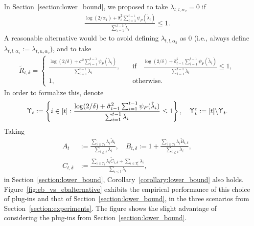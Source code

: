 In Section~\ref{section:lower_bound}, we proposed to take $\lambda_{t, l ,\alpha_2} = 0$ if
\begin{align*}
    \frac{\log(2/\alpha_1) + \hat\sigma^2_{t} \sum_{i=1}^{t-1} \psi_P(\tilde \lambda_i)}{\sum_{i=1}^{t-1} \tilde \lambda_i} \leq 1.
\end{align*}
A reasonable alternative would be to avoid defining $\lambda_{t, l ,\alpha_2}$ as $0$ (i.e., always define $\lambda_{t, l ,\alpha_2} := \lambda_{t, u ,\alpha_2}$), and to take
\begin{align*}
    \tilde R_{t, \delta} = \begin{cases}
        \frac{\log(2/\delta) + \sigma^2\sum_{i=1}^{t-1} \psi_P(\tilde \lambda_i)}{\sum_{i=1}^{t-1} \tilde \lambda_i}, \quad &\text{if} \quad \frac{\log(2/\delta) + \hat\sigma^2_{t-1} \sum_{i=1}^{t-1} \psi_P(\tilde \lambda_i)}{\sum_{i=1}^{t-1} \tilde \lambda_i} \leq 1, \\
        1, \quad &\text{otherwise}.
    \end{cases}
\end{align*}
In order to formalize this, denote
\begin{align*}
    \Upsilon_t := \left\{ i \in [t] : \frac{\log(2/\delta) + \hat\sigma^2_{t-1}\sum_{i=1}^{t-1} \psi_P(\tilde \lambda_i)}{\sum_{i=1}^{t-1} \tilde \lambda_i} \leq 1 \right\}, \quad  \Upsilon_t^c := [t] \backslash \Upsilon_t.
\end{align*}
Taking
\begin{align*}
    A_{t} &:=  \frac{\sum_{i \in \Upsilon_t}\lambda_i \tilde A_{i}}{\sum_{i \leq t} \lambda_i}, 
    \quad B_{t, \delta} := 1 +  \frac{\sum_{i \in \Upsilon_t}\lambda_i \tilde B_{i, \delta}}{\sum_{i \leq t} \lambda_i},
    \\ C_{t, \delta} &:= \frac{\sum_{i \in \Upsilon_t}\lambda_i \tilde C_{i, \delta} + \sum_{i \in \Upsilon_t^c}\lambda_i}{\sum_{i \leq t} \lambda_i},
\end{align*}
in Section~\ref{section:lower_bound}, Corollary~\ref{corollary:lower_bound} also holds. Figure~\ref{fig:eb_vs_ebalternative} exhibits the empirical performance of this choice of plug-ins and that of Section~\ref{section:lower_bound}, in the three scenarios from Section~\ref{section:experiments}. The figure shows the slight advantage of considering the plug-ins from Section~\ref{section:lower_bound}.







